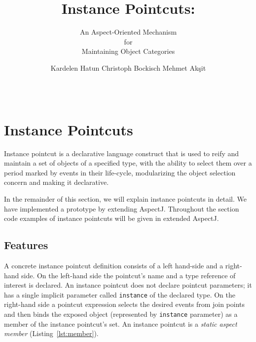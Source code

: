 \documentclass{acm_proc_article-sp}
\begin{document}
\title{Instance Pointcuts:}
\subtitle{An Aspect-Oriented Mechanism \\for \\Maintaining Object Categories}

\author{
\alignauthor
Kardelen Hatun \hspace{2cm} Christoph Bockisch \hspace{2cm} Mehmet Ak\c{s}it\\
\\
\\
}




\section{Instance Pointcuts}
Instance pointcut is a declarative language construct that is used to reify and maintain a set of objects of a specified type, with the ability to select them over a period marked by events in their life-cycle, modularizing the object selection concern and making it declarative. 
 
In the remainder of this section, we will explain instance pointcuts in detail. We have implemented a prototype by extending AspectJ. Throughout the section code examples of instance pointcuts will be given in extended AspectJ.


\subsection{Features}
\label{sec:features}

A concrete instance pointcut definition consists of a left hand-side and a right-hand side. 
On the left-hand side the pointcut's name and a type reference of interest is declared. 
An instance pointcut does not declare pointcut parameters; it has a single implicit parameter called \texttt{instance} of the declared type. 
On the right-hand side a pointcut expression selects the desired events from join points and then binds the exposed object (represented by \texttt{instance} parameter) as a member of the instance pointcut's set. 
An instance pointcut is a \emph{static aspect member} (Listing~\ref{lst:member}).%
\end{document}

